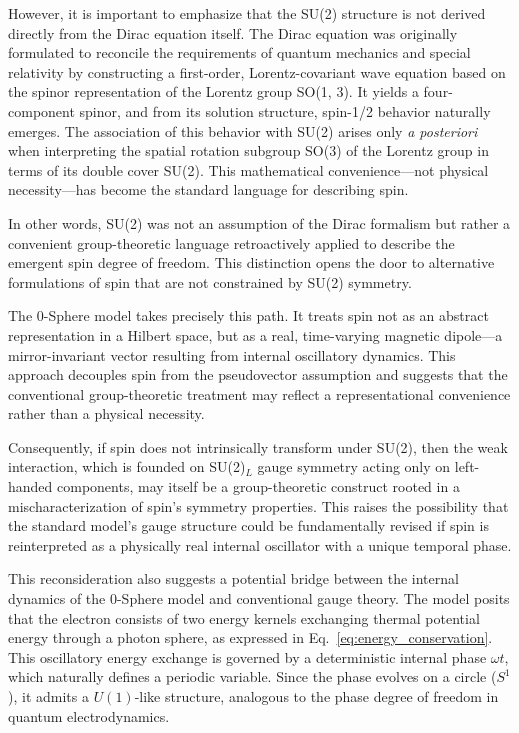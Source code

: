 \documentclass[12pt,letterpaper]{article} %
\begin{document}
However, it is important to emphasize that the SU(2) structure is not derived directly from the Dirac equation itself. The Dirac equation was originally formulated to reconcile the requirements of quantum mechanics and special relativity by constructing a first-order, Lorentz-covariant wave equation based on the spinor representation of the Lorentz group SO(1, 3). It yields a four-component spinor, and from its solution structure, spin-1/2 behavior naturally emerges. The association of this behavior with SU(2) arises only \textit{a posteriori} when interpreting the spatial rotation subgroup SO(3) of the Lorentz group in terms of its double cover SU(2). This mathematical convenience—not physical necessity—has become the standard language for describing spin.

In other words, SU(2) was not an assumption of the Dirac formalism but rather a convenient group-theoretic language retroactively applied to describe the emergent spin degree of freedom. This distinction opens the door to alternative formulations of spin that are not constrained by SU(2) symmetry.

The 0-Sphere model takes precisely this path. It treats spin not as an abstract representation in a Hilbert space, but as a real, time-varying magnetic dipole—a mirror-invariant vector resulting from internal oscillatory dynamics. This approach decouples spin from the pseudovector assumption and suggests that the conventional group-theoretic treatment may reflect a representational convenience rather than a physical necessity.

Consequently, if spin does not intrinsically transform under SU(2), then the weak interaction, which is founded on SU(2)$_L$ gauge symmetry acting only on left-handed components, may itself be a group-theoretic construct rooted in a mischaracterization of spin's symmetry properties. This raises the possibility that the standard model’s gauge structure could be fundamentally revised if spin is reinterpreted as a physically real internal oscillator with a unique temporal phase.

This reconsideration also suggests a potential bridge between the internal dynamics of the 0-Sphere model and conventional gauge theory. The model posits that the electron consists of two energy kernels exchanging thermal potential energy through a photon sphere, as expressed in Eq.~\eqref{eq:energy_conservation}. This oscillatory energy exchange is governed by a deterministic internal phase $\omega t$, which naturally defines a periodic variable. Since the phase evolves on a circle ($S^1$), it admits a $U(1)$-like structure, analogous to the phase degree of freedom in quantum electrodynamics.
\end{document}
